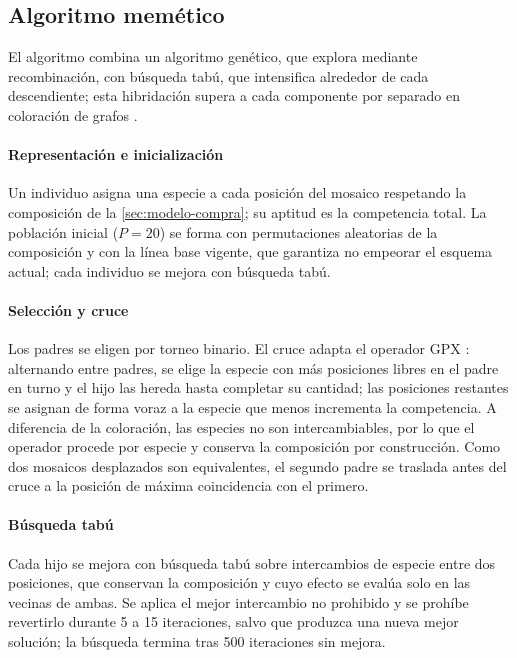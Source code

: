 \subsection{Algoritmo memético}
\label{subsec:espacial-memetico}

El algoritmo combina un algoritmo genético, que explora mediante recombinación, con búsqueda tabú, que intensifica alrededor de cada descendiente; esta hibridación supera a cada componente por separado en coloración de grafos \autocite{galinier1999}.

\paragraph{Representación e inicialización} Un individuo asigna una especie a cada posición del mosaico respetando la composición de la \cref{sec:modelo-compra}; su aptitud es la competencia total. La población inicial ($P=20$) se forma con permutaciones aleatorias de la composición y con la línea base vigente, que garantiza no empeorar el esquema actual; cada individuo se mejora con búsqueda tabú.

\paragraph{Selección y cruce} Los padres se eligen por torneo binario. El cruce adapta el operador GPX \autocite{galinier1999}: alternando entre padres, se elige la especie con más posiciones libres en el padre en turno y el hijo las hereda hasta completar su cantidad; las posiciones restantes se asignan de forma voraz a la especie que menos incrementa la competencia. A diferencia de la coloración, las especies no son intercambiables, por lo que el operador procede por especie y conserva la composición por construcción. Como dos mosaicos desplazados son equivalentes, el segundo padre se traslada antes del cruce a la posición de máxima coincidencia con el primero.

\paragraph{Búsqueda tabú} Cada hijo se mejora con búsqueda tabú \autocite{glover1989,hertz1987} sobre intercambios de especie entre dos posiciones, que conservan la composición y cuyo efecto se evalúa solo en las vecinas de ambas. Se aplica el mejor intercambio no prohibido y se prohíbe revertirlo durante 5 a 15 iteraciones, salvo que produzca una nueva mejor solución; la búsqueda termina tras 500 iteraciones sin mejora.

